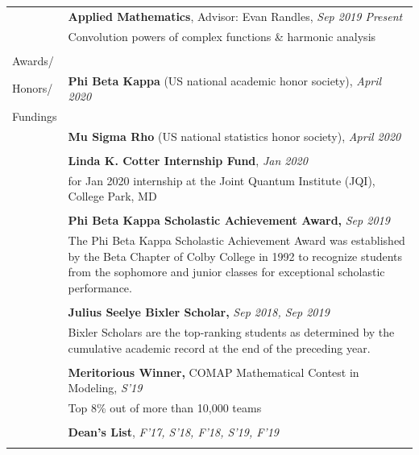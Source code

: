 \documentclass[10pt]{article}
\begin{document}
\begin{longtable}{ l m{14.5cm}   }
	& \textbf{Applied Mathematics}, Advisor: Evan Randles, \textit{Sep 2019 \textendash Present}\\
	& Convolution powers of complex functions \& harmonic analysis\\
	& \\
     					
     					



\large{Awards/}    	& \\
\large{Honors/}		& \textbf{Phi Beta Kappa} (US national academic honor society), \textit{April 2020} \\
\large{Fundings}	& \\
& \textbf{Mu Sigma Rho} (US national statistics honor society), \textit{April 2020}\\
&\\
& \textbf{Linda K. Cotter Internship Fund}, \textit{Jan 2020}\\
& for Jan 2020 internship at the Joint Quantum Institute (JQI), College Park, MD\\
&\\
& \textbf{Phi Beta Kappa Scholastic Achievement Award,} \textit{Sep 2019}\\
& The Phi Beta Kappa Scholastic Achievement Award was established by the Beta Chapter of Colby College in 1992 to recognize students from the sophomore and junior classes for exceptional scholastic performance.\\
&\\
& \textbf{Julius Seelye Bixler Scholar,} \textit{Sep 2018, Sep 2019}\\
& Bixler Scholars are the top-ranking students as determined by the cumulative academic record at the end of the preceding year.\\
&\\
& \textbf{Meritorious Winner,}  COMAP Mathematical Contest in Modeling, \textit{S'19}\\
& Top 8\% out of more than 10,000 teams\\
&\\
& \textbf{Dean’s List}, \textit{F'17, S'18, F'18, S'19, F'19}\\
&\\
		
  
   						
   
     					
     					

     					   		   					 
     					 

\end{longtable}
\end{document}
